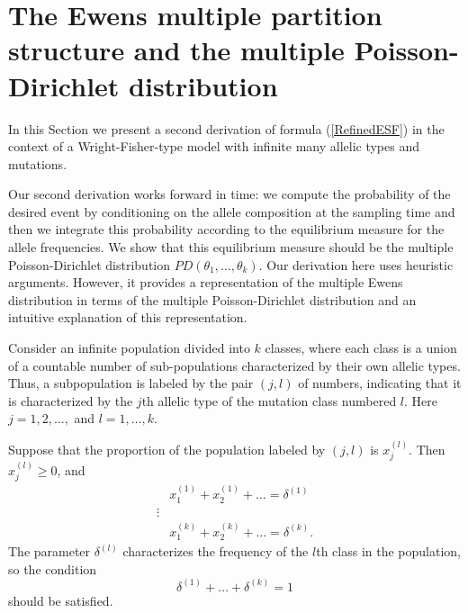 \documentclass[12pt]{amsart}
\theoremstyle{definition}
\numberwithin{equation}{section}
\begin{document}
\section{The Ewens multiple partition structure and the multiple Poisson-Dirichlet distribution}\label{SectionDerivation1}

In this Section we present a second derivation of formula (\ref{RefinedESF}) in the context of a Wright-Fisher-type model with infinite many allelic types
and mutations.

Our second derivation
works forward in time: we compute the probability of the desired event by conditioning on the allele composition at the sampling time and then we integrate
this probability according to the equilibrium measure for the allele frequencies.
We show that this equilibrium measure should be the multiple Poisson-Dirichlet distribution $PD(\theta_1,\ldots,\theta_k)$.
Our derivation here uses heuristic arguments. However,
it provides a representation of the multiple Ewens distribution in terms of the multiple Poisson-Dirichlet distribution and
an intuitive explanation of this representation.

Consider an infinite population divided into
$k$ classes, where each class is a union of a countable number of sub-populations characterized by their own allelic types. Thus, a subpopulation is labeled by
the pair $(j,l)$ of numbers, indicating that it is characterized by the $j$th allelic type of the mutation class numbered $l$. Here $j=1,2,\ldots,$ and $l=1,\ldots,k$.

Suppose that the proportion of the population labeled by $(j,l)$ is $x_j^{(l)}$. Then
$x_j^{(l)}\geq 0$,  and
\begin{equation}\label{111.2.1}
\begin{split}
&x_1^{(1)}+x_2^{(1)}+\ldots=\delta^{(1)}\\
\vdots\\
&x_1^{(k)}+x_2^{(k)}+\ldots=\delta^{(k)}.
\end{split}
\end{equation}
The parameter $\delta^{(l)}$ characterizes the frequency of the $l$th class in the population, so the condition
\begin{equation}\label{111.2.2}
\delta^{(1)}+\ldots+\delta^{(k)}=1
\end{equation}
should be satisfied.
\end{document}
